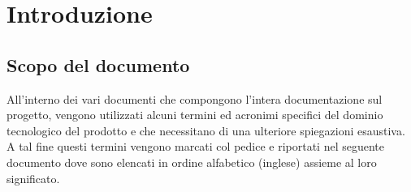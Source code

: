 \newpage
\section{Introduzione}

\subsection{Scopo del documento}
All'interno dei vari documenti che compongono l'intera documentazione sul progetto, vengono utilizzati alcuni termini ed acronimi specifici del dominio tecnologico del prodotto e che necessitano di una ulteriore spiegazioni esaustiva. A tal fine questi termini vengono marcati col pedice  e riportati nel seguente documento dove sono elencati in ordine alfabetico (inglese) assieme al loro significato.
